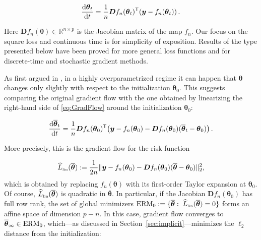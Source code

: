 \begin{align}

  \frac{{\rm d} {\boldsymbol \theta}_t}{{\rm d} t} = \frac{1}{n}{\boldsymbol D} f_n({\boldsymbol \theta}_t)^{{\mathsf T}}({\boldsymbol y}-f_n({\boldsymbol \theta}_t))\, .\label{eq:GradFlow}

\end{align}

Here ${\boldsymbol D} f_n({\boldsymbol \theta})\in{\mathbb R}^{n\times p}$ is the Jacobian matrix of the map $f_n$. Our focus on the square loss and continuous time is for simplicity of exposition. Results of the type presented below have been proved for more general loss functions and for discrete-time and stochastic gradient methods.

As first argued in \cite{jacot2018neural}, in a highly overparametrized regime it can happen that  ${\boldsymbol \theta}$ changes only slightly with respect to the initialization ${\boldsymbol \theta}_0$. This suggests comparing the original gradient flow with the one obtained by linearizing the right-hand side of \eqref{eq:GradFlow} around the initialization ${\boldsymbol \theta}_0$:

\begin{align}

  \frac{{\rm d} \overline{\boldsymbol \theta}_t}{{\rm d} t} = \frac{1}{n}{\boldsymbol D} f_n({\boldsymbol \theta}_0)^{{\mathsf T}}\big({\boldsymbol y}-f_n({\boldsymbol \theta}_0)-{\boldsymbol D}  f_n({\boldsymbol \theta}_0)(\overline{\boldsymbol \theta}_t-{\boldsymbol \theta}_0)\big)\, .
  \label{eq:LinearizedEvolution}

\end{align}

More precisely, this is  the gradient flow for the risk function

\begin{align} 
  \widehat{L}_{\mbox{\rm\tiny lin}}(\overline{\boldsymbol \theta}) := \frac{1}{2n}\| {\boldsymbol y}-f_n({\boldsymbol \theta}_0)-{\boldsymbol D}
  f_n({\boldsymbol \theta}_0) (\overline{\boldsymbol \theta}-{\boldsymbol \theta}_0)\|_{2}^2,

  \end{align}
which is obtained by replacing $f_n({\boldsymbol \theta})$ with its first-order Taylor expansion at ${\boldsymbol \theta}_0$. 
  Of course,   $\widehat{L}_{\mbox{\rm\tiny lin}}(\overline{\boldsymbol \theta})$ is quadratic in $\overline{\boldsymbol \theta}$. 
  In particular, if the Jacobian ${\boldsymbol D} f_n({\boldsymbol \theta}_0)$ has full row rank, the set of global minimizers ${\rm ERM}_0:=\{\overline{\boldsymbol \theta}: \;  \widehat{L}_{\mbox{\rm\tiny lin}}(\overline{\boldsymbol \theta}) = 0 \}$ forms an affine space of dimension $p-n$. In this case, gradient flow converges to $\overline{\boldsymbol \theta}_{\infty}\in{\rm ERM}_0$, which---as discussed in Section~\ref{sec:implicit}---minimizes the $\ell_2$ distance from the initialization:

